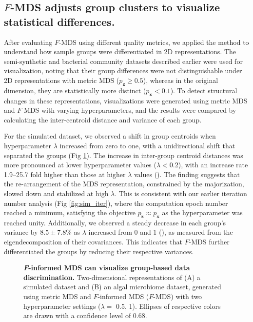 \documentclass[10pt,letterpaper]{article}
\newcommand{\1}{{\rm 1}\kern-0.24em{\rm I}}
\begin{document}
\subsection*{$F$-MDS adjusts group clusters to visualize statistical differences.} \label{sec:vis_fmds}
After evaluating $F$-MDS using different quality metrics, we applied the method to understand how sample groups were differentiated in 2D representations. The semi-synthetic and bacterial community datasets described earlier were used for visualization, noting that their group differences were not distinguishable under 2D representations with metric MDS ($p_\mathbf{z}\geq 0.5$), whereas in the original dimension, they are statistically more distinct ($p_\mathbf{x}<0.1$). To detect structural changes in these representations, visualizations were generated using metric MDS and $F$-MDS with varying hyperparameters, and the results were compared by calculating the inter-centroid distance and variance of each group.

For the simulated dataset, we observed a shift in group centroids when hyperparameter $\lambda$ increased from zero to one, with a unidirectional shift that separated the groups (Fig \ref{fig:vis}). The increase in inter-group centroid distances was more pronounced at lower hyperparameter values ($\lambda < 0.2$), with an increase rate 1.9--25.7 fold higher than those at higher $\lambda$ values (). The finding suggests that the re-arrangement of the MDS representation, constrained by the majorization, slowed down and stabilized at high $\lambda$. This is consistent with our earlier iteration number analysis (Fig \ref{fig:sim_iter}), where the computation epoch number reached a minimum, satisfying the objective $p_\mathbf{z}\approx p_\mathbf{x}$ as the hyperparameter was reached unity. Additionally, we observed a steady decrease in each group's variance by $8.5\pm7.8\%$ as $\lambda$ increased from 0 and 1 (), as measured from the eigendecomposition of their covariances. This indicates that $F$-MDS further differentiated the groups by reducing their respective variances. 


\begin{figure}[h!]
    \centering
    \caption{\textbf{\textit{F}-informed MDS can visualize group-based data discrimination.} Two-dimensional representations of (A) a simulated dataset and (B) an algal microbiome dataset, generated using metric MDS and $F$-informed MDS ($F$-MDS) with two hyperparameter settings ($\lambda=$ 0.5, 1). Ellipses of respective colors are drawn with a confidence level of 0.68.}
    \label{fig:vis}
\end{figure}
\end{document}
